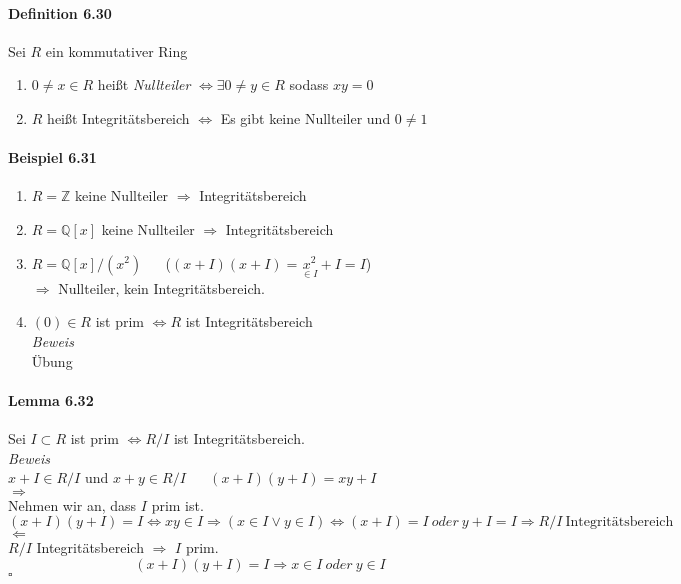 \documentclass{scrartcl}
\begin{document}
\paragraph{Definition 6.30}
Sei $R$ ein kommutativer Ring
\begin{enumerate}
\item $0 \neq x \in R$ heißt \textit{Nullteiler}
  $\Leftrightarrow \exists 0 \neq y \in R$ sodass $xy = 0$
\item $R$ heißt Integritätsbereich $\Leftrightarrow$
  Es gibt keine Nullteiler und $0 \neq 1$
\end{enumerate}

\paragraph{Beispiel 6.31}
\begin{enumerate}
\item $R = \mathbb{Z}$ keine Nullteiler  $\Rightarrow$ Integritätsbereich
\item $R = \mathbb{Q}[x]$ keine Nullteiler $\Rightarrow$ Integritätsbereich
\item $R = \mathbb{Q}[x]/\left(x^2\right)$ ~~
  ($(x + I)(x + I) = \underset{\in I}{x^2} + I = I$) \\
  $\Rightarrow$ Nullteiler, kein Integritätsbereich.
\item $(0) \in R$ ist prim $\Leftrightarrow R$ ist Integritätsbereich \\
  \textit{Beweis} \\
  Übung
\end{enumerate}

\paragraph{Lemma 6.32}
Sei $I \subset R$ ist prim $\Leftrightarrow R/I$ ist Integritätsbereich. \\
\textit{Beweis} \\
$x + I \in R/I$ und $x + y \in R/I$ ~~ $(x+I)(y+I) = xy + I$ \\
\grqq $\Rightarrow$ \grqq \\
Nehmen wir an, dass $I$ prim ist.
\[
  (x + I)(y + I) = I \Leftrightarrow xy \in I \Rightarrow (x \in I \vee y \in I)
  \Leftrightarrow (x + I) = I ~oder~ y + I = I
  \Rightarrow R/I ~\text{Integritätsbereich}
\]
\grqq $\Leftarrow$ \grqq \\
$R/I$ Integritätsbereich $\Rightarrow$ $I$ prim.
\[
  (x + I)(y + I) = I \Rightarrow x \in I ~oder~ y \in I
\]
\hfill $\square$
\end{document}
